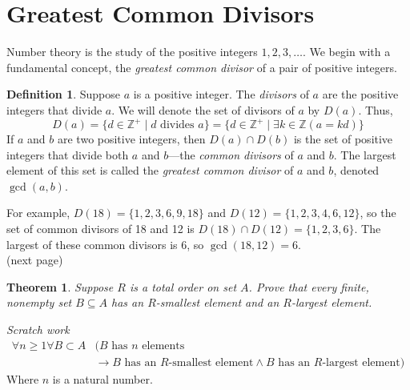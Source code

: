 \documentclass{report}
\newtheorem*{theorem}{Theorem}
\theoremstyle{definition}
\newtheorem*{definition}{Definition}
\begin{document}
\section{Greatest Common Divisors}
Number theory is the study of the positive integers $1,2,3,\ldots$. We begin with a fundamental concept, the \textit{greatest common divisor} of a pair of positive integers.
\begin{definition}
Suppose $a$ is a positive integer. The \textit{divisors} of $a$ are the positive integers that divide $a$. We will denote the set of divisors of $a$ by $D(a)$. Thus,
\begin{equation*}
D(a)=\{d\in\mathbb Z^+\mid d\text{ divides }a\}=\{d\in\mathbb Z^+\mid\exists k\in\mathbb Z(a=kd)\}
\end{equation*}
If $a$ and $b$ are two positive integers, then $D(a)\cap D(b)$ is the set of positive integers that divide both $a$ and $b$---the \textit{common divisors} of $a$ and $b$. The largest element of
this set is called the \textit{greatest common divisor} of $a$ and $b$, denoted $\gcd(a,b)$.
\end{definition}
\noindent For example, $D(18)=\{1,2,3,6,9,18\}$ and $D(12)=\{1,2,3,4,6,12\}$, so the set of common divisors of 18 and 12 is $D(18)\cap D(12)=\{1,2,3,6\}$. The largest of these common divisors
is 6, so $\gcd(18,12)=6$.\\
(next page)\newpage
\begin{theorem}
Suppose $R$ is a total order on set $A$. Prove that every finite, nonempty set $B\subseteq A$ has an $R$-smallest element and an $R$-largest element.
\end{theorem}
\noindent\textit{Scratch work}
\begin{align*}
\forall n\geq1\forall B\subset A&(B\text{ has $n$ elements}\\&\to B\text{ has an $R$-smallest element}\land B\text{ has an $R$-largest element})
\end{align*}
Where $n$ is a natural number.
\end{document}

